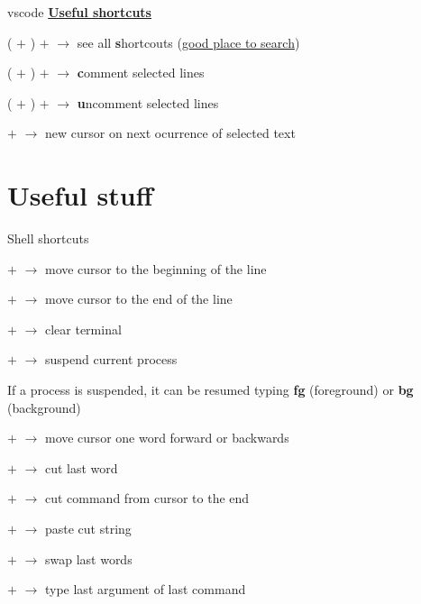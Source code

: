 \documentclass[10pt,a4paper]{article}
\begin{document}
\begin{multicols}{3}
\begin{textbox}{vscode}
\underline{\textbf{Useful shortcuts}}

( $+$ ) $+$  $\rightarrow$ see all \textbf{s}hortcouts (\underline{good place to search})

( $+$ ) $+$  $\rightarrow$ \textbf{c}omment selected lines 

( $+$ ) $+$  $\rightarrow$ \textbf{u}ncomment selected lines 

 $+$  $\rightarrow$ new cursor on next ocurrence of selected text


\end{textbox}


\section{Useful stuff}

\begin{textbox}{Shell shortcuts}

 $+$  $\rightarrow$ move cursor to the beginning of the line

 $+$  $\rightarrow$ move cursor to the end of the line

 $+$  $\rightarrow$ clear terminal 

 $+$  $\rightarrow$ suspend current process 

If a process is suspended, it can be resumed typing \textbf{fg} (foreground) or \textbf{bg} (background)


 $+$  \keystroke{$\leftarrow$}\keystroke{$\rightarrow$} $\rightarrow$ move cursor one word forward or backwards

 $+$  $\rightarrow$ cut last word

 $+$  $\rightarrow$ cut command from cursor to the end

 $+$  $\rightarrow$ paste cut string

 $+$  $\rightarrow$ swap last words

 $+$  $\rightarrow$ type last argument of last command

\end{textbox}




\end{multicols}
\end{document}
